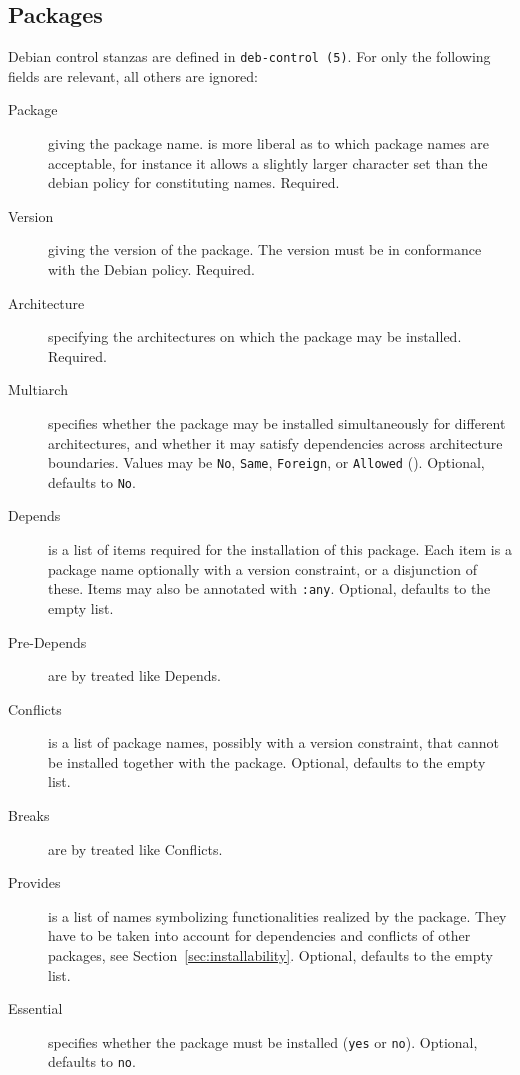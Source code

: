 \subsection{Packages}
\label{sec:packages}
Debian control stanzas are defined in \texttt{deb-control~(5)}. For
\debcheck{} only the following fields are relevant, all others are
ignored:
\begin{description}
\item[Package] giving the package name. \debcheck{} is more liberal as
  to which package names are acceptable, for instance it allows a
  slightly larger character set than the debian policy for
  constituting names. Required.
\item[Version] giving the version of the package. The version must be
  in conformance with the Debian policy. Required.
\item[Architecture] specifying the architectures on which the package
  may be installed. Required.
\item[Multiarch] specifies whether the package may be installed
  simultaneously for different architectures, and whether it may
  satisfy dependencies across architecture boundaries. Values may be
  \texttt{No}, \texttt{Same}, \texttt{Foreign}, or \texttt{Allowed}
  (\cite{ubuntu:multiarch}). Optional, defaults to \texttt{No}.
\item[Depends] is a list of items required for the installation of
  this package. Each item is a package name optionally with a version
  constraint, or a disjunction of these.  Items may also be annotated
  with \texttt{:any}. Optional, defaults to the empty list.
\item[Pre-Depends] are by \debcheck{} treated like Depends.
\item[Conflicts] is a list of package names, possibly with a version
  constraint, that cannot be installed together with the package. Optional,
  defaults to the empty list.
\item[Breaks] are by \debcheck{} treated like Conflicts.
\item[Provides] is a list of names symbolizing functionalities
  realized by the package. They have to be taken into account for
  dependencies and conflicts of other packages, see
  Section~\ref{sec:installability}. Optional, defaults to the empty
  list.
\item[Essential] specifies whether the package must be installed
  (\texttt{yes} or \texttt{no}). Optional, defaults to \texttt{no}.
\end{description}


